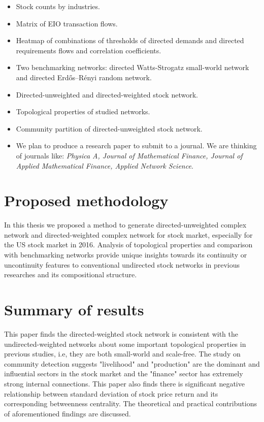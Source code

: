 \begin{itemize}
	\item Stock counts by industries.
	\item Matrix of EIO transaction flows.
	\item Heatmap of combinations of thresholds of directed demands and directed requirements flows and correlation coefficients.
	\item Two benchmarking networks: directed Watts-Strogatz small-world network and directed Erdős–Rényi random network.
	\item Directed-unweighted and directed-weighted stock network.
	\item Topological properties of studied networks.
	\item Community partition of directed-unweighted stock network.
	\item We plan to produce a research paper to submit to a journal. We are thinking of journals like:  \textit{Physica A, Journal of Mathematical Finance, Journal of Applied Mathematical Finance, Applied Network Science}.
\end{itemize}

\section{Proposed methodology}


In this thesis we proposed a method to generate directed-unweighted complex network and directed-weighted complex network for stock market, especially for the US stock market in 2016. Analysis of topological properties and comparison with benchmarking networks provide unique insights towards its continuity or uncontinuity features to conventional undirected stock networks in previous researches and its compositional structure.

\section{Summary of results}
This paper finds the directed-weighted stock network is consistent with the undirected-weighted networks about some important topological properties in previous studies, i.e, they are both small-world and scale-free. The study on community detection suggests "livelihood" and "production" are the dominant and influential sectors in the stock market and the "finance" sector has extremely strong internal connections. This paper also finds there is significant negative relationship between standard deviation of stock price return and its corresponding betweenness centrality. The theoretical and practical contributions of aforementioned findings are discussed.

